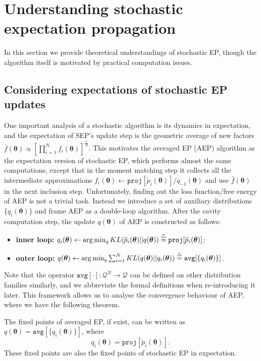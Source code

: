 \section{Understanding stochastic expectation propagation}
In this section we provide theoretical understandings of stochastic EP, though the algorithm itself is motivated by practical computation issues. 

\subsection{Considering expectations of stochastic EP updates}
One important analysis of a stochastic algorithm is its dynamics in expectation, and the expectation of SEP's update step is the geometric average of new factors
$\bar{f}(\bm{\theta}) \propto [\prod_{i=1}^N f_i(\bm{\theta})]^{\frac{1}{N}}$.
This motivates the averaged EP (AEP) algorithm as the expectation version of stochastic EP, which performs almost the same computations, except that in the moment matching step it collects all the intermediate approximations $f_i(\bm{\theta}) \leftarrow \mathtt{proj}[\tilde{p}_i(\bm{\theta})] / q_{-1}(\bm{\theta})$ and use $\bar{f}(\bm{\theta})$ in the next inclusion step. 
Unfortunately, finding out the loss function/free energy of AEP is not a trivial task. Instead we introduce a set of auxiliary distributions $\{q_i(\bm{\theta})\}$ and frame AEP as a double-loop algorithm. After the cavity computation step, the update $q(\bm{\theta})$ of AEP is constructed as follows:
%
\begin{itemize}
	\item \textbf{inner loop:} $q_i(\bm{\theta}) \leftarrow \arg\min_q KL(\tilde{p}_i(\bm{\theta}) ||q(\bm{\theta})) \buildrel\triangle\over = \mathtt{proj}[\tilde{p}_i(\bm{\theta})]$; 
	\item \textbf{outer loop:} $q(\bm{\theta}) \leftarrow \arg\min_q \sum_{i=1}^N KL(q(\bm{\theta}) ||q_i(\bm{\theta})) \buildrel\triangle\over = \mathtt{avg}[\{q_i(\bm{\theta})\}]$.
\end{itemize}
%
Note that the operator $\mathtt{avg}[\cdot]: \mathcal{Q}^N \rightarrow \mathcal{Q}$ can be defined on other distribution families similarly, and we abbreviate the formal definitions when re-introducing it later.
This framework allows us to analyse the convergence behaviour of AEP, where we have the following theorem.
\begin{theorem}
The fixed points of averaged EP, if exist, can be written as $q(\bm{\theta}) = \mathtt{avg}[\{q_i(\bm{\theta})\}]$, where
\begin{equation}
q_i(\bm{\theta}) = \mathtt{proj}[\tilde{p}_i(\bm{\theta})].
\label{eq:mm}
\end{equation}
These fixed points are also the fixed points of stochastic EP in expectation. 
\end{theorem}
